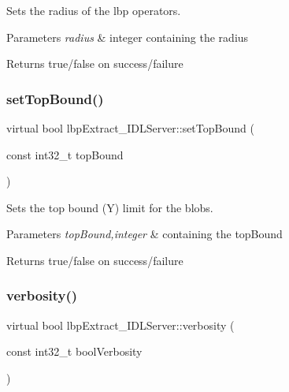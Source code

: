 Sets the radius of the lbp operators. 


\begin{DoxyParams}{Parameters}
{\em radius} & integer containing the radius \\
\hline
\end{DoxyParams}
\begin{DoxyReturn}{Returns}
true/false on success/failure 
\end{DoxyReturn}
\mbox{\label{classlbpExtract__IDLServer_a50677882bf32262601b91046a2dcdbf2}} 
\subsubsection{\texorpdfstring{set\+Top\+Bound()}{setTopBound()}}
{\footnotesize\ttfamily virtual bool lbp\+Extract\+\_\+\+I\+D\+L\+Server\+::set\+Top\+Bound (\begin{DoxyParamCaption}\item[{const int32\+\_\+t}]{top\+Bound }\end{DoxyParamCaption})\hspace{0.3cm}{\ttfamily [virtual]}}



Sets the top bound (Y) limit for the blobs. 


\begin{DoxyParams}{Parameters}
{\em top\+Bound,integer} & containing the top\+Bound \\
\hline
\end{DoxyParams}
\begin{DoxyReturn}{Returns}
true/false on success/failure 
\end{DoxyReturn}
\mbox{\label{classlbpExtract__IDLServer_a1b9021d363199f1a334c7ec2c23801b1}} 
\subsubsection{\texorpdfstring{verbosity()}{verbosity()}}
{\footnotesize\ttfamily virtual bool lbp\+Extract\+\_\+\+I\+D\+L\+Server\+::verbosity (\begin{DoxyParamCaption}\item[{const int32\+\_\+t}]{bool\+Verbosity }\end{DoxyParamCaption})\hspace{0.3cm}{\ttfamily [virtual]}}



